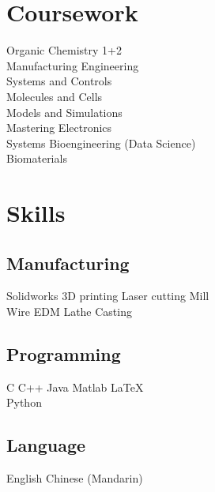 \documentclass[]{deedy-resume}
\begin{document}
\begin{minipage}[t]{0.3\textwidth}



\section{Coursework}
Organic Chemistry 1+2\\
Manufacturing Engineering\\
Systems and Controls\\
Molecules and Cells\\
Models and Simulations\\
Mastering Electronics\\
Systems Bioengineering (Data Science)\\
Biomaterials\\



\section{Skills}
\subsection{Manufacturing}
Solidworks \textbullet{}   3D printing \textbullet{} Laser cutting \textbullet{} Mill \\
Wire EDM \textbullet{} Lathe  \textbullet{} Casting \\
\sectionsep
\subsection{Programming}
C \textbullet{} C++ \textbullet{} Java \textbullet{} Matlab \textbullet \LaTeX \\
Python
\sectionsep
\subsection{Language}
English \textbullet{} Chinese (Mandarin)
\sectionsep

\end{minipage}
\end{document}
